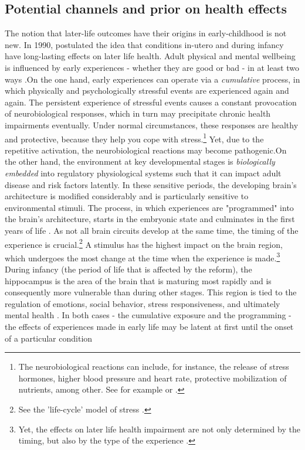 \documentclass[11pt, a4paper]{article} %
\begin{document}
 





\subsection[Channels]{Potential channels and prior on health effects}
The notion that later-life outcomes have their origins in early-childhood is not new. In 1990, \citeauthor{Barker1990origins} postulated the idea that conditions in-utero and during infancy have long-lasting effects on later life health. Adult physical and mental wellbeing is influenced by early experiences - whether they are good or bad - in at least two ways \citep{shonkoff2009neuroscience}.\newline On the one hand, early experiences can operate via a \emph{cumulative} process, in which physically and psychologically stressful events are experienced again and again. The persistent experience of stressful events causes a constant provocation of neurobiological responses, which in turn may precipitate chronic health impairments eventually. Under normal circumstances, these responses are healthy and protective, because they help you cope with stress.\footnote{The neurobiological reactions can include, for instance, the release of stress hormones, higher blood pressure and heart rate, protective mobilization of nutrients, among other. See for example \cite{mcewen1998stress} or \cite{shonkoff2009neuroscience}.} Yet, due to the repetitive activation, the neurobiological reactions may become pathogenic.\newline On the other hand, the environment at key developmental stages is \emph{biologically embedded} into regulatory physiological systems such that it can impact adult disease and risk factors latently. In these sensitive periods, the developing brain's architecture is modified considerably and is particularly sensitive to environmental stimuli. The process, in which experiences are "programmed" into the brain's architecture, starts in the embryonic state and culminates in the first years of life \citep{raikkonen2012early}. As not all brain circuits develop at the same time, the timing of the experience is crucial.\footnote{See the 'life-cycle' model of stress \citep{lupien2009effects}.} A stimulus has the highest impact on the brain region, which undergoes the most change at the time when the experience is made.\footnote{Yet, the effects on later life health impairment are not only determined by the timing, but also by the type of the experience \citep{raikkonen2012early}.} During infancy (the period of life that is affected by the reform), the hippocampus is the area of the brain that is maturing most rapidly and is consequently more vulnerable than during other stages. This region is tied to the regulation of emotions, social behavior, stress responsiveness, and ultimately mental health \citep{center2016best,shonkoff2009neuroscience}. \newline In both cases - the cumulative exposure and the programming - the effects of experiences made in early life may be latent at first until the onset of a particular condition 
\end{document}
